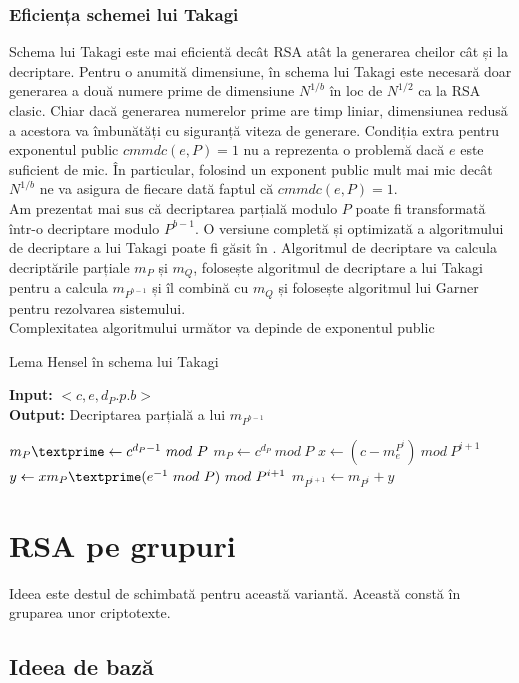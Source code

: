 \documentclass[12]{report}
\begin{document}
\subsubsection{Eficiența schemei lui Takagi}
Schema lui Takagi este mai eficientă decât RSA atât la generarea cheilor cât și la decriptare. Pentru o anumită dimensiune, în schema lui Takagi este necesară doar generarea a două numere prime de dimensiune $N^{1/b}$ în loc de $N^{1/2}$ ca la RSA clasic. Chiar dacă generarea numerelor prime are timp liniar, dimensiunea redusă a acestora va îmbunătăți cu siguranță viteza de generare. Condiția extra pentru exponentul public $cmmdc(e,P)=1$ nu a reprezenta o problemă dacă $e$ este suficient de mic. În particular, folosind un exponent public mult mai mic decât $N^{1/b}$ ne va asigura de fiecare dată faptul că $cmmdc(e,P)=1$. \\
Am prezentat mai sus că decriptarea parțială modulo $P$ poate fi transformată într-o decriptare modulo $P^{b-1}$. O versiune completă și optimizată a algoritmului de decriptare a lui Takagi poate fi găsit în \cite{takagi}. Algoritmul de decriptare va calcula decriptările parțiale $m_P$ și $m_Q$, folosește algoritmul de decriptare a lui Takagi pentru a calcula $m_{P^{b-1}}$ și îl combină cu $m_Q$ și folosește algoritmul lui Garner pentru rezolvarea sistemului. \\
Complexitatea algoritmului următor va depinde de exponentul public
\begin{algorithm}[H]
		   \caption{Lema Hensel în schema lui Takagi}
		   \textbf{Input:} $<c,e,d_P.p.b>$ \\
		   \textbf{Output:} Decriptarea parțială a lui $ m_{P^{b-1}} $
		   \begin{algorithmic}
		   	\State $m_P \textprime \gets c^{d_P -1} \ mod \ P$
		   	\State $m_P \gets c^{d_P} \ mod \ P$
		   	\State $x \gets (c-m_{e}^{P^i}) \ mod \ P^{i+1}$
		   	\State $y \gets xm_P \textprime (e^{-1} \ mod \ P) \ mod \ P^{i+1}$
		   	\State $m_{P^{i+1}} \gets m_{P^i} +y $
		   	\EndFor
		   \end{algorithmic}
		   \end{algorithm} 	  
		   
		  
		  \section{RSA pe grupuri}
		  Ideea este destul de schimbată pentru această variantă. Această constă în gruparea unor criptotexte.
		  \subsection{Ideea de bază}
\end{document}
